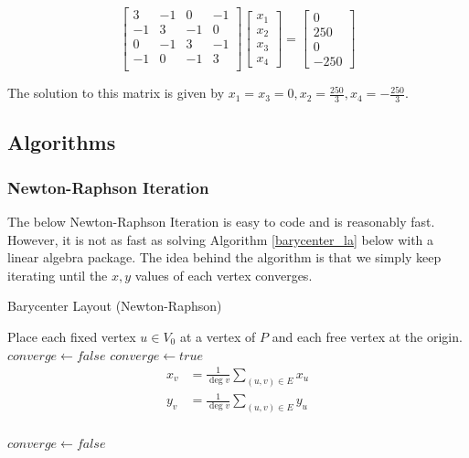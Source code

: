 \documentclass[11pt]{report}
\begin{document}
\[
\begin{bmatrix}
    3 & -1 & 0 & -1 \\
    -1 & 3 & -1 & 0 \\
    0 & -1 & 3 & -1 \\
    -1 & 0 & -1 & 3 \\
\end{bmatrix}
\begin{bmatrix} x_1 \\ x_2 \\ x_3 \\ x_4 \end{bmatrix} =
\begin{bmatrix} 0 \\ 250 \\ 0 \\ -250 \end{bmatrix}
\]

The solution to this matrix is given by $x_1 = x_3 = 0, x_2 = \frac{250}{3}, x_4 = -\frac{250}{3}$.

\subsection{Algorithms}
\subsubsection{Newton-Raphson Iteration}
The below Newton-Raphson Iteration is easy to code and is reasonably fast. However, it is not as fast as solving Algorithm \ref{barycenter_la} below with a linear algebra package. The idea behind the algorithm is that we simply keep iterating until the $x, y$ values of each vertex converges.

\begin{algorithm}[H]
    \caption{Barycenter Layout (Newton-Raphson)}
    \begin{algorithmic}[1]
        \State Place each fixed vertex $u \in V_0$ at a vertex of $P$ and each free vertex at the origin.
        \State $converge \gets false$
            \State $converge \gets true$
                \[
                \begin{aligned}
                x_v &= \frac{1}{\deg{v}} \sum_{(u, v) \in E} x_u \\
                y_v &= \frac{1}{\deg{v}} \sum_{(u, v) \in E} y_u \\
                \end{aligned}
                \]
                
                \State {}
                    \State $converge \gets false$
                \EndIf
            \EndFor
        \EndWhile
        \EndProcedure
    \end{algorithmic}
\end{algorithm}
\end{document}
